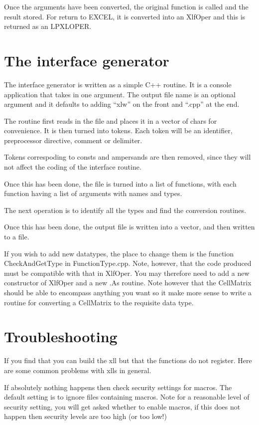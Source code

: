 \documentclass[12pt,reqno]{amsart}
\numberwithin{equation}{section}
\numberwithin{figure}{section}
\begin{document}
Once the arguments have been converted, the original function is
called and the result stored. For return to EXCEL, it is converted
into an XlfOper and this is returned as an LPXLOPER.

 
\section{The interface generator}

The interface generator is written as a simple C++ routine. It is a
console application that takes in one argument. The output file name
is an optional argument and it defaults to adding ``xlw'' on the front
and ``.cpp'' at the end.

The routine first reads in the file and places it in a vector of chars
for convenience. It is then turned into tokens. Each token will be an
identifier, preprocessor directive,  comment or delimiter. 

Tokens correspoding to consts and ampersands are then removed, since
they will not affect the coding of the interface routine. 

Once this has been done, the file is turned into a list of functions,
with each function having a list of arguments with names and types.

The next operation is to identify all the types and find the
conversion routines. 

Once this has been done, the output file is written into a vector, and
then written to a file. 

If you wish to add new datatypes, the place to change them is the
function CheckAndGetType in FunctionType.cpp. Note, however, that the
code produced must be compatible with that in XlfOper. You may
therefore need to add a new constructor of XlfOper and a new .As
routine. Note however that the CellMatrix should be able to encompass
anything you want so it make more sense to write a routine for
converting a CellMatrix to the requisite data type. 

\section{Troubleshooting}

 If you find that you can build the xll but that the functions do not
register. Here are some common problems with xlls in general. 

If absolutely nothing happens then check security settings for
macros. The default setting is to ignore files containing macros. Note
for a reasonable level of security setting, you will get asked whether
to enable macros, if this does not happen then security levels are too
high (or too low!)
\end{document}
